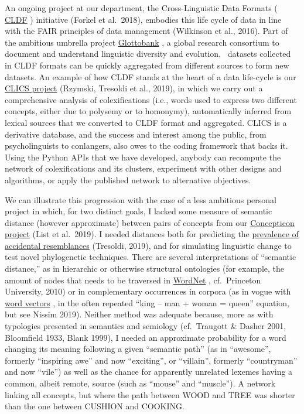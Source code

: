 \documentclass[
  a4paper,
  14pt,
  oneside,
  tablecaptionabove
]{scrbook}
\begin{document}
An ongoing project at our department, the Cross-Linguistic Data Formats
( \href{https://cldf.clld.org}{CLDF} ) initiative (Forkel et al.~2018),
embodies this life cycle of data in line with the FAIR principles of
data management (Wilkinson et al., 2016). Part of the ambitious umbrella
project \href{https://glottobank.org/}{Glottobank} , a global research
consortium to document and understand linguistic diversity and
evolution,~ datasets collected in CLDF formats can be quickly aggregated
from different sources to form new datasets. An example of how CLDF
stands at the heart of a data life-cycle is our
\href{https://matthew.clld.org/clics/}{CLICS project} (Rzymski, Tresoldi
et al., 2019), in which we carry out a comprehensive analysis of
colexifications (i.e., words used to express two different concepts,
either due to polysemy or to homonymy), automatically inferred from
lexical sources that we converted to CLDF format and aggregated. CLICS
is a derivative database, and the success and interest among the public,
from psycholinguists to conlangers, also owes to the coding framework
that backs it. Using the Python APIs that we have developed, anybody can
recompute the network of colexifications and its clusters, experiment
with other designs and algorithms, or apply the published network to
alternative objectives.

We can illustrate this progression with the case of a less ambitious
personal project in which, for two distinct goals, I lacked some measure
of semantic distance (however approximate) between pairs of concepts
from our \href{https://concepticon.clld.org/}{Concepticon project} (List
et al.~2019). I needed distances both for predicting the
\href{https://speakerdeck.com/tresoldi/a-cross-linguistic-computational-approach-on-chance-resemblances}{prevalence
of accidental resemblances} (Tresoldi, 2019), and for simulating
linguistic change to test novel phylogenetic techniques. There are
several interpretations of \enquote{semantic distance,} as in hierarchic
or otherwise structural ontologies (for example, the amount of nodes
that needs to be traversed in
\href{https://wordnet.princeton.edu/}{WordNet} , cf.~Princeton
University, 2010) or in complementary occurrences in corpora (as in
vogue with \href{https://en.wikipedia.org/wiki/Word_embedding}{word
vectors} , in the often repeated \enquote{king -- man + woman = queen}
equation, but see Nissim 2019). Neither method was adequate because,
more as with typologies presented in semantics and semiology
(cf.~Traugott \& Dasher 2001, Bloomfield 1933, Blank 1999), I needed an
approximate probability for a word changing its meaning following a
given \enquote{semantic path} (as in \enquote{awesome}, formerly
\enquote{inspiring awe} and now \enquote{exciting}, or
\enquote{villain}, formerly \enquote{countryman} and now \enquote{vile})
as well as the chance for apparently unrelated lexemes having a common,
albeit remote, source (such as \enquote{mouse} and \enquote{muscle}). A
network linking all concepts, but where the path between WOOD and TREE
was shorter than the one between CUSHION and COOKING.
\end{document}
